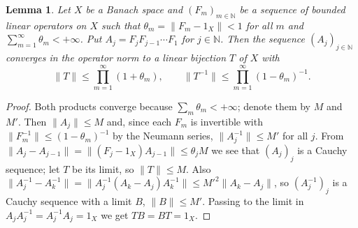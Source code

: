 \documentclass[12pt]{article}
\newtheorem{lemma}[theorem]{Lemma}
\newcommand{\norm}[1]{\lVert #1\rVert}
\begin{document}
\begin{lemma}\label{ProductLemma} Let $X$ be a Banach space and
    ${(F_m)}_{m\in\mathbb{N}}$ be a sequence of bounded linear operators on $X$
    such that $\theta_m=\norm{F_m-1_X}<1$ for all $m$ and
    $\sum_{m=1}^\infty\theta_m<+\infty$. Put $A_j=F_jF_{j-1}\cdots F_1$ for
    $j\in\mathbb{N}$. Then the sequence ${(A_j)}_{j\in\mathbb{N}}$ converges in
    the operator norm to a linear bijection $T$ of $X$ with
    \[
    \norm{T}\leq\prod_{m=1}^\infty(1+\theta_m),\qquad
    \norm{T^{-1}}\leq\prod_{m=1}^\infty{(1-\theta_m)}^{-1}.
    \]
\end{lemma}
\begin{proof} Both products converge because $\sum_m\theta_m<+\infty$; denote
    them by $M$ and $M'$. Then $\norm{A_j}\leq M$ and, since each $F_m$ is
    invertible with $\norm{F_m^{-1}}\leq{(1-\theta_m)}^{-1}$ by the Neumann
    series, $\norm{A_j^{-1}}\leq M'$ for all $j$. From
    $\norm{A_j-A_{j-1}}=\norm{(F_j-1_X)A_{j-1}}\leq\theta_j M$ we see that
    ${(A_j)}_j$ is a Cauchy sequence; let $T$ be its limit, so $\norm{T}\leq M$.
    Also $\norm{A_j^{-1}-A_k^{-1}}=\norm{A_j^{-1}(A_k-A_j)A_k^{-1}}\leq
    {M'}^2\norm{A_k-A_j}$, so ${(A_j^{-1})}_j$ is a Cauchy sequence with a
    limit $B$, $\norm{B}\leq M'$. Passing to the limit in
    $A_jA_j^{-1}=A_j^{-1}A_j=1_X$ we get $TB=BT=1_X$.
\end{proof}
\end{document}
